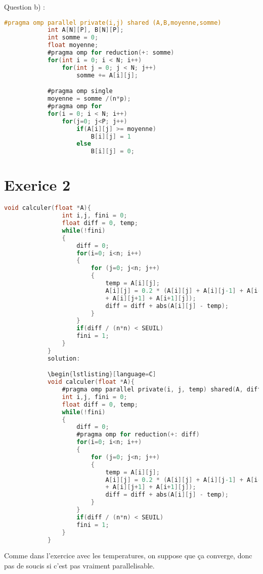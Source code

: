 \documentclass[10pt,a4paper]{article}
\begin{document}
            Question b) :
            \begin{lstlisting}[language=C]
            #pragma omp parallel private(i,j) shared (A,B,moyenne,somme)
            int A[N][P], B[N][P];
            int somme = 0;
            float moyenne;
            #pragma omp for reduction(+: somme)
            for(int i = 0; i < N; i++)
                for(int j = 0; j < N; j++)
                    somme += A[i][j];

            #pragma omp single
            moyenne = somme /(n*p);
            #pragma omp for
            for(i = 0; i < N; i++)
                for(j=0; j<P; j++)
                    if(A[i][j] >= moyenne)
                        B[i][j] = 1
                    else
                        B[i][j] = 0;

            \end{lstlisting}

            \section{Exerice 2}

            \begin{lstlisting}[language=C]
            void calculer(float *A){
                int i,j, fini = 0;
                float diff = 0, temp;
                while(!fini)
                {
                    diff = 0;
                    for(i=0; i<n; i++)
                    {
                        for (j=0; j<n; j++)
                        {
                            temp = A[i][j];
                            A[i][j] = 0.2 * (A[i][j] + A[i][j-1] + A[i-1][j]
                            + A[i][j+1] + A[i+1][j]);
                            diff = diff + abs(A[i][j] - temp);
                        }
                    }
                    if(diff / (n*n) < SEUIL)
                    fini = 1;
                }
            }
            solution:

            \begin{lstlisting}[language=C]
            void calculer(float *A){
                #pragma omp parallel private(i, j, temp) shared(A, diff, SEUIL, n, fini)
                int i,j, fini = 0;
                float diff = 0, temp;
                while(!fini)
                {
                    diff = 0;
                    #pragma omp for reduction(+: diff)
                    for(i=0; i<n; i++)
                    {
                        for (j=0; j<n; j++)
                        {
                            temp = A[i][j];
                            A[i][j] = 0.2 * (A[i][j] + A[i][j-1] + A[i-1][j]
                            + A[i][j+1] + A[i+1][j]);
                            diff = diff + abs(A[i][j] - temp);
                        }
                    }
                    if(diff / (n*n) < SEUIL)
                    fini = 1;
                }
            }
            \end{lstlisting}
            Comme dans l'exercice avec les temperatures, on suppose que ça converge, donc pas de soucis
            si c'est pas vraiment parallelisable.
\end{document}
